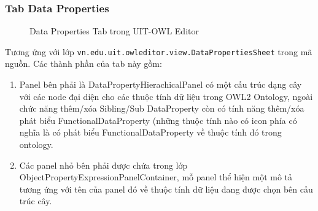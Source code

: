 \subsubsection{Tab Data Properties}
\begin{figure}[h!]
	\centering
	\caption{Data Properties Tab trong UIT-OWL Editor\label{overflow}}
\end{figure}
Tương ứng với lớp \verb|vn.edu.uit.owleditor.view.DataPropertiesSheet| trong mã nguồn. Các thành phần của tab này gồm:
\begin{enumerate}
\item Panel bên phải là DataPropertyHierachicalPanel có một cấu trúc dạng cây với các node đại diện cho các thuộc tính dữ liệu trong OWL2 Ontology, ngoài chức năng thêm/xóa Sibling/Sub DataProperty còn có tính năng thêm/xóa phát biểu FunctionalDataProperty (những thuộc tính nào có icon phía có nghĩa là có phát biểu FunctionalDataProperty về thuộc tính đó trong ontology.
\item Các panel nhỏ bên phải được chứa trong lớp ObjectPropertyExpressionPanelContainer, mỗ panel thể hiện một mô tả tương ứng với tên của panel đó về thuộc tính dữ liệu đang được chọn bên cấu trúc cây.
\end{enumerate}	

